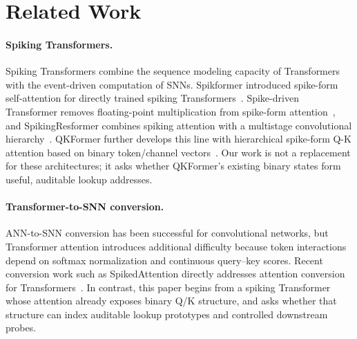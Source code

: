 \section{Related Work}
\label{sec:related}

\paragraph{Spiking Transformers.}
Spiking Transformers combine the sequence modeling capacity of Transformers
with the event-driven computation of SNNs. Spikformer introduced spike-form
self-attention for directly trained spiking Transformers~\cite{zhou2023spikformer}.
Spike-driven Transformer removes floating-point multiplication from spike-form
attention~\cite{yao2023spikedriven}, and SpikingResformer combines spiking
attention with a multistage convolutional hierarchy~\cite{shi2024spikingresformer}.
QKFormer further develops this line with hierarchical spike-form Q-K attention
based on binary token/channel vectors~\cite{zhou2024qkformer}. Our work is not a
replacement for these architectures; it asks whether QKFormer's existing
binary states form useful, auditable lookup addresses.

\paragraph{Transformer-to-SNN conversion.}
ANN-to-SNN conversion has been successful for convolutional networks, but
Transformer attention introduces additional difficulty because token
interactions depend on softmax normalization and continuous query--key scores.
Recent conversion work such as SpikedAttention directly addresses attention
conversion for Transformers~\cite{hwang2024spikedattention}. In contrast, this
paper begins from a spiking Transformer whose attention already exposes binary
Q/K structure, and asks whether that structure can index auditable lookup
prototypes and controlled downstream probes.

